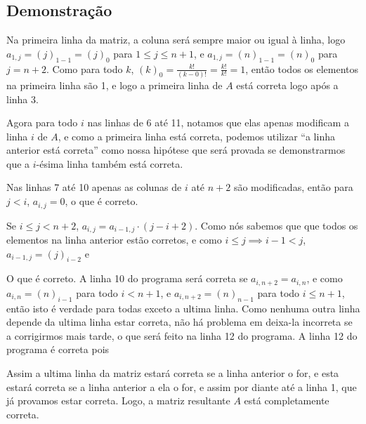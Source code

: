 \documentclass[a4paper, 10pt]{article}
\begin{document}
\subsection{Demonstra\c{c}\~ao}

Na primeira linha da matriz, a coluna ser\'a sempre maior ou igual \`a linha, logo
$a_{1,j} = (j)_{1-1} = (j)_0$ para $1 \leq j \leq n+1$, e $a_{1,j} = (n)_{1-1} = (n)_0$
para $j = n+2$. Como para todo $k$, $(k)_0 = \frac{k!}{(k - 0 )!} = \frac{k!}{k!} = 1$,
ent\~ao todos os elementos na primeira linha s\~ao 1, e logo a primeira linha de $A$ est\'a
correta logo ap\'os a linha 3.

Agora para todo $i$ nas linhas de 6 at\'e 11, notamos que elas apenas modificam a linha $i$
de $A$, e como a primeira linha est\'a correta, podemos utilizar ``a linha anterior est\'a correta''
como nossa hip\'otese que ser\'a provada se demonstrarmos que a $i$-\'esima linha tamb\'em
est\'a correta.

Nas linhas 7 at\'e 10 apenas as colunas de $i$ at\'e $n + 2$ s\~ao modificadas, ent\~ao para
$j < i$, $a_{i,j} = 0$, o que \'e correto.

Se $i \leq j < n + 2$, $a_{i,j} = a_{i-1, j} \cdot (j - i + 2)$. Como n\'os sabemos que que
todos os elementos na linha anterior est\~ao corretos, e como $i \leq j \implies i - 1 < j$,
$a_{i-1, j} = (j)_{i-2}$ e

\algorithmIthRow

O que \'e correto. A linha 10 do programa ser\'a correta se $a_{i,n+2} = a_{i,n}$, e como
$a_{i,n} = (n)_{i-1}$ para todo $i < n+1$, e $a_{i,n+2} = (n)_{n-1}$ para todo $i \leq n+1$,
ent\~ao isto \'e verdade para todas exceto a ultima linha. Como nenhuma outra linha depende
da ultima linha estar correta, n\~ao h\'a problema em deixa-la incorreta se a corrigirmos
mais tarde, o que ser\'a feito na linha 12 do programa. A linha 12 do programa \'e correta
pois
\algorithmLast

Assim a ultima linha da matriz estar\'a correta se a linha anterior o for, e esta estar\'a
correta se a linha anterior a ela o for, e assim por diante at\'e a linha 1, que j\'a provamos
estar correta. Logo, a matriz resultante $A$ est\'a completamente correta.
\end{document}
